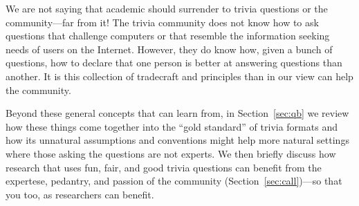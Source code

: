 We are not saying that academic  should surrender to trivia questions or the community---far from it!
The trivia community does not know how to ask questions that challenge computers or that resemble the information seeking needs of users on the Internet.
However, they do know how, given a bunch of questions, how to declare that one person is better at answering questions than another.
It is this collection of tradecraft and principles than in our view can help the  community.

Beyond these general concepts that  can learn from, in
Section~\ref{sec:qb} we review how these things come together into the ``gold standard'' of trivia formats and how its unnatural assumptions and conventions might help more natural  settings where those asking the questions are not experts.
We then briefly discuss how research that uses fun, fair, and good
trivia questions can benefit from the expertese, pedantry, and passion
of the community (Section~\ref{sec:call})---so that you too, as
researchers can benefit.